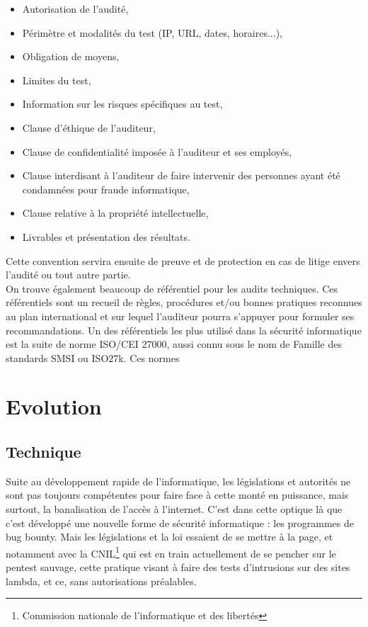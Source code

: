 \documentclass[a4paper]{memoir}
\begin{document}
\begin{itemize}
\item Autorisation de l'audité,
\item Périmètre et modalités du test (IP, URL, dates, horaires...),
\item Obligation de moyens,
\item Limites du test,
\item Information sur les risques spécifiques au test,
\item Clause d'éthique de l'auditeur,
\item Clause de confidentialité imposée à l'auditeur et ses employés,
\item Clause interdisant à l'auditeur de faire intervenir des personnes ayant été condamnées pour fraude informatique,
\item Clause relative à la propriété intellectuelle,
\item Livrables et présentation des résultats.\\
\end{itemize}

Cette convention servira ensuite de preuve et de protection en cas de litige envers l'audité ou tout autre partie. \\

On trouve également beaucoup de référentiel pour les audits techniques.
Ces référentiels sont un recueil de règles, procédures et/ou bonnes pratiques reconnues au plan international et sur lequel l'auditeur pourra s’appuyer pour formuler ses recommandations.
Un des référentiels les plus utilisé dans la sécurité informatique est la suite de norme ISO/CEI 27000, aussi connu sous le nom de Famille des standards SMSI ou ISO27k\cite{bworld4}. Ces normes 





\part{Evolution}

\chapter{Technique}

Suite au développement rapide de l'informatique, les législations et autorités ne sont pas toujours compétentes pour faire face à cette monté en puissance, mais surtout, la banalisation de l'accès à l'internet.
C'est dans cette optique là que c'est développé une nouvelle forme de sécurité informatique : les programmes de bug bounty.
Mais les législations et la loi essaient de se mettre à la page, et notamment avec la CNIL\footnote{Commission nationale de l'informatique et des libertés} qui est en train actuellement de se pencher sur le pentest sauvage, cette pratique visant à faire des tests d'intrusions sur des sites lambda, et ce, sans autorisations préalables. 
\end{document}
